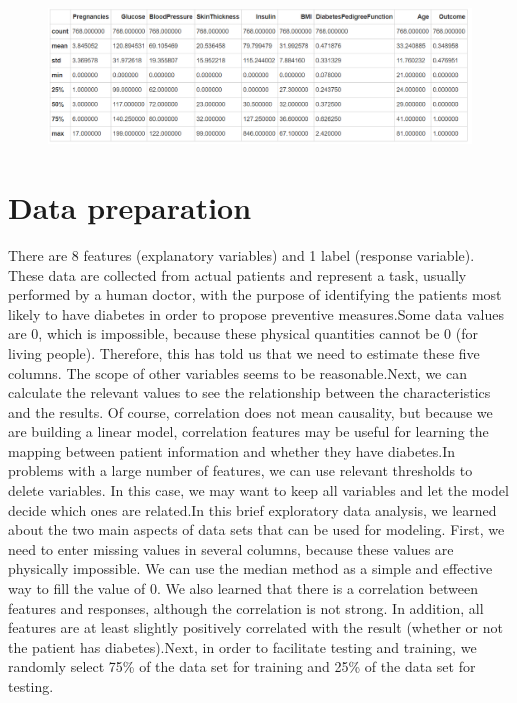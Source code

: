 \documentclass[11pt,en]{elegantpaper}
\begin{document}
\begin{figure}[H]
    \centering
    \includegraphics[scale=0.6]{figure/2.PNG}  
\end{figure}



\section{Data preparation}
There are 8 features (explanatory variables) and 1 label (response variable). These data are collected from actual patients and represent a task, usually performed by a human doctor, with the purpose of identifying the patients most likely to have diabetes in order to propose preventive measures.Some data values are 0, which is impossible, because these physical quantities cannot be 0 (for living people). Therefore, this has told us that we need to estimate these five columns. The scope of other variables seems to be reasonable.Next, we can calculate the relevant values to see the relationship between the characteristics and the results. Of course, correlation does not mean causality, but because we are building a linear model, correlation features may be useful for learning the mapping between patient information and whether they have diabetes.In problems with a large number of features, we can use relevant thresholds to delete variables. In this case, we may want to keep all variables and let the model decide which ones are related.In this brief exploratory data analysis, we learned about the two main aspects of data sets that can be used for modeling. First, we need to enter missing values in several columns, because these values are physically impossible. We can use the median method as a simple and effective way to fill the value of 0. We also learned that there is a correlation between features and responses, although the correlation is not strong. In addition, all features are at least slightly positively correlated with the result (whether or not the patient has diabetes).Next, in order to facilitate testing and training, we randomly select 75\% of the data set for training and 25\% of the data set for testing.
\end{document}

